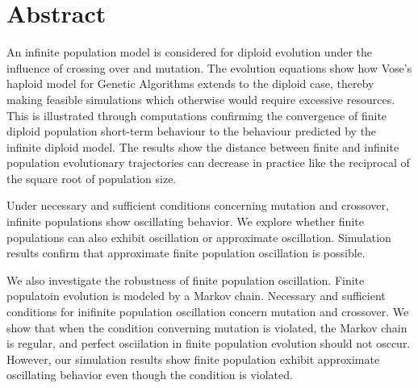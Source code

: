 \chapter*{Abstract}\label{ch:abstract}
An infinite population model is considered for diploid evolution under the influence of crossing over
and mutation. The evolution equations show how Vose's 
haploid model for Genetic Algorithms extends to the diploid case, thereby making feasible simulations
which otherwise would require excessive resources. This is illustrated through computations confirming
the convergence of finite diploid population short-term behaviour to the behaviour predicted by the
infinite diploid model. The results show the distance between finite and infinite population evolutionary trajectories can 
decrease in practice like the reciprocal of the square root of population size. 

Under necessary and sufficient conditions concerning mutation and crossover, 
infinite populations show oscillating behavior. 
We explore whether finite populations can also exhibit oscillation or approximate oscillation. 
Simulation results confirm that approximate finite population oscillation is possible. 

We also investigate the robustness of finite population oscillation.  
Finite populatoin evolution is modeled by a Markov chain. Necessary and sufficient conditions 
for inifinite population oscillation concern mutation and crossover. 
We show that when the condition converning mutation is violated, 
the Markov chain is regular, and perfect osciilation in 
finite population evolution should not osccur.
However, our simulation results show finite population exhibit 
approximate oscillating behavior even though the condition is violated.



